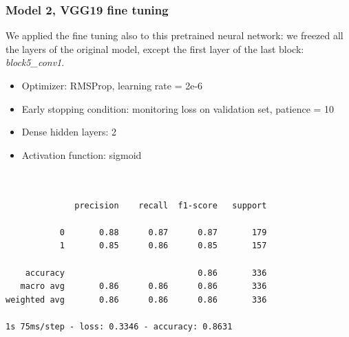 \documentclass{article}
\begin{document}
\subsubsection{Model 2, VGG19 fine tuning}
We applied the fine tuning also to this pretrained neural network: we freezed all the layers of the original model, except the first layer of the last block: \textit{block5\_conv1}.

\begin{itemize}
\item Optimizer: RMSProp, learning rate = 2e-6
\item Early stopping condition: monitoring loss on validation set, patience = 10
\item Dense hidden layers: 2
\item Activation function: sigmoid
\end{itemize}

\begin{verbatim}


              precision    recall  f1-score   support

           0       0.88      0.87      0.87       179
           1       0.85      0.86      0.85       157

    accuracy                           0.86       336
   macro avg       0.86      0.86      0.86       336
weighted avg       0.86      0.86      0.86       336

1s 75ms/step - loss: 0.3346 - accuracy: 0.8631

\end{verbatim}
\end{document}
